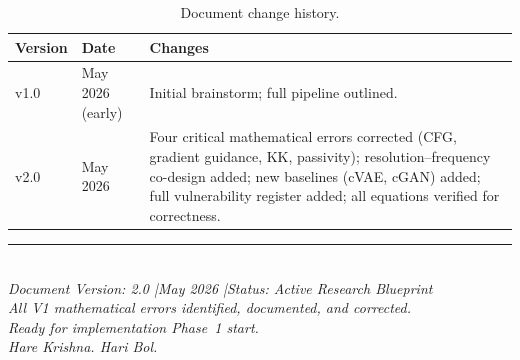 \documentclass[12pt,a4paper]{article}
\theoremstyle{definition}
\theoremstyle{plain}
\theoremstyle{remark}
\begin{document}
\begin{table}[H]
\centering
\caption{Document change history.}
\label{tab:versions}
\begin{tabularx}{\linewidth}{llX}
\toprule
\textbf{Version} & \textbf{Date} & \textbf{Changes} \\
\midrule
v1.0 & May 2026 (early) & Initial brainstorm; full pipeline outlined. \\
v2.0 & May 2026         & Four critical mathematical errors corrected
                          (CFG, gradient guidance, KK, passivity);
                          resolution--frequency co-design added;
                          new baselines (cVAE, cGAN) added;
                          full vulnerability register added;
                          all equations verified for correctness. \\
\bottomrule
\end{tabularx}
\end{table}

\bigskip
\begin{center}
\rule{0.6\linewidth}{0.4pt}\\[4pt]
{\small\color{gray}
  \textit{Document Version: 2.0 \quad|\quad May 2026 \quad|\quad Status: Active Research Blueprint}\\[2pt]
  \textit{All V1 mathematical errors identified, documented, and corrected.}\\[2pt]
  \textit{Ready for implementation Phase~1 start.}\\[8pt]
  \textit{Hare Krishna. Hari Bol.}
}
\end{center}
\end{document}
